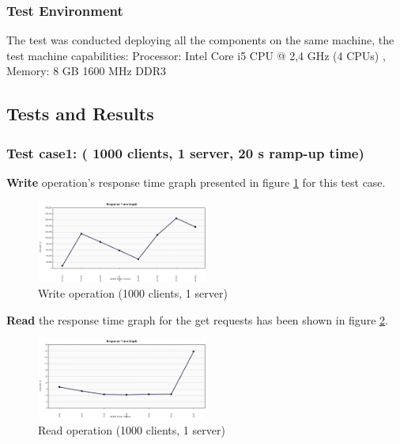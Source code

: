 \documentclass{sig-alternate}
\begin{document}
\subsubsection{Test Environment}			
The test was conducted deploying all the components on the same machine, the test machine capabilities: Processor: Intel Core i5 CPU @ 2,4 GHz (4 CPUs) , Memory: 8 GB 1600 MHz DDR3

\subsection{Tests and Results}
\subsubsection{Test case1: ( 1000 clients, 1 server, 20 s ramp-up time)}
\textbf{Write}  operation's response time graph presented in figure \ref{put_1_1000} for this  test case.
\begin{center}
\begin{figure}[ht!]
\centering
     \includegraphics[width=0.5\textwidth]{put_1_1000_response.png}
\caption{Write operation (1000 clients, 1 server) \label{put_1_1000}}
\end{figure}
\end{center}

\textbf{Read} the response time graph for the get requests has been shown in figure \ref{get_1_1000}.
\begin{center}
\begin{figure}[ht!]
\centering
     \includegraphics[width=0.5\textwidth]{get_1_1000_response.png}
\caption{Read operation (1000 clients, 1 server) \label{get_1_1000}}
\end{figure}
\end{center}
\end{document}
